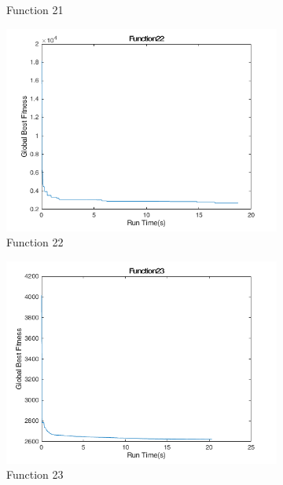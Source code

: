 \begin{figure}
\begin{subfigure}[b]{0.4\textwidth}
    \caption{Function 21}
  \end{subfigure}
  \begin{subfigure}[b]{0.4\textwidth}
    \includegraphics[width=\textwidth]{img/cecrt/f22}
    \caption{Function 22}
  \end{subfigure}
  \begin{subfigure}[b]{0.4\textwidth}
    \includegraphics[width=\textwidth]{img/cecrt/f23}
    \caption{Function 23}
  \end{subfigure}
  \begin{subfigure}[b]{0.4\textwidth}

\end{subfigure}
\end{figure}
